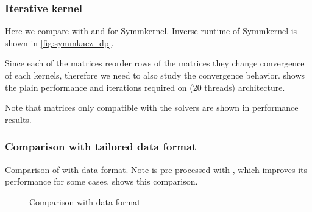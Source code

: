 \subsubsection{Iterative kernel}
Here we compare  \RACE with \ABMC and \MC for Symm\KACZ kernel. Inverse runtime of Symm\KACZ kernel is shown in \cref{fig:symmkacz_dp}.

 Since each of the matrices reorder rows of the matrices they change convergence of each kernels, therefore we need to also study the convergence behavior.  shows the plain performance and iterations required on \SKX (20 threads) architecture.

Note that matrices only compatible with the \KACZ solvers are shown in performance results.




\subsubsection{Comparison with tailored data format}
Comparison of \RACE with \RSB data format. Note \RSB is pre-processed with \RCM, which improves its performance for some cases.  shows this comparison.

\begin{figure}[thbp]
	\centering
	\hspace{1.2em}
	\caption{Comparison with \RSB data format}
	\label{fig:race_vs_rsb}
\end{figure}


